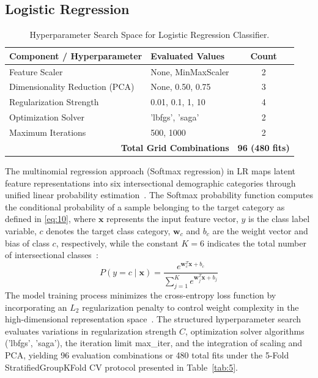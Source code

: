\subsection{Logistic Regression}
\label{sec:logistic_regression}

\begin{table}[htbp]
\caption{Hyperparameter Search Space for Logistic Regression Classifier.}
\label{tab:5}
\label{tab:V}
\label{tab:lr_params}
\centering
\footnotesize
\begin{tabular}{llc}
\toprule
Component / Hyperparameter & Evaluated Values & Count \\
\midrule
Feature Scaler & None, MinMaxScaler & 2 \\
Dimensionality Reduction (PCA) & None, 0.50, 0.75 & 3 \\
Regularization Strength & 0.01, 0.1, 1, 10 & 4 \\
Optimization Solver & 'lbfgs', 'saga' & 2 \\
Maximum Iterations & 500, 1000 & 2 \\
\midrule
\multicolumn{2}{r}{\textbf{Total Grid Combinations}} & \textbf{96 (480 fits)} \\
\bottomrule
\end{tabular}
\end{table}

The multinomial regression approach (Softmax regression) in LR maps latent feature representations into six intersectional demographic categories through unified linear probability estimation~\cite{ref37}. The Softmax probability function computes the conditional probability of a sample belonging to the target category as defined in \eqref{eq:10}, where $\mathbf{x}$ represents the input feature vector, $y$ is the class label variable, $c$ denotes the target class category, $\mathbf{w}_c$ and $b_c$ are the weight vector and bias of class $c$, respectively, while the constant $K = 6$ indicates the total number of intersectional classes~\cite{ref38}:
\begin{equation}
P(y = c \mid \mathbf{x}) = \frac{e^{\mathbf{w}_c^T \mathbf{x} + b_c}}{\sum_{j=1}^K e^{\mathbf{w}_j^T \mathbf{x} + b_j}}
\label{eq:10}
\end{equation}
The model training process minimizes the cross-entropy loss function by incorporating an $L_2$ regularization penalty to control weight complexity in the high-dimensional representation space~\cite{ref39}. The structured hyperparameter search evaluates variations in regularization strength $C$, optimization solver algorithms ('lbfgs', 'saga'), the iteration limit max\_iter, and the integration of scaling and PCA, yielding 96 evaluation combinations or 480 total fits under the 5-Fold StratifiedGroupKFold CV protocol presented in Table~\ref{tab:5}.
